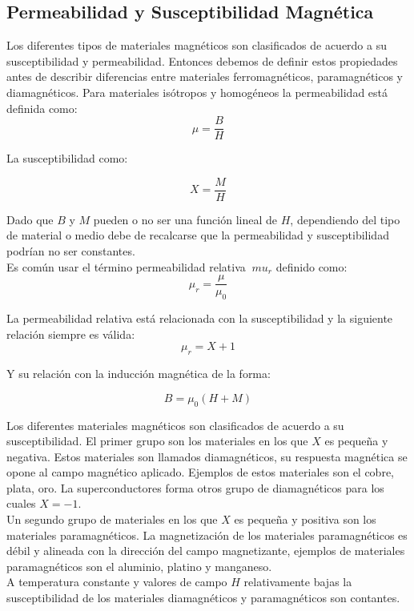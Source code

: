 \subsection{Permeabilidad y Susceptibilidad Magnética}

Los diferentes tipos de materiales magnéticos son clasificados de acuerdo a su susceptibilidad y permeabilidad. Entonces debemos de definir estos propiedades antes de describir diferencias entre materiales ferromagnéticos, paramagnéticos y diamagnéticos.
Para materiales isótropos y homogéneos la permeabilidad está definida como:
\begin{equation}
	\mu = \frac{B}{H}
\end{equation}

La susceptibilidad como:

\begin{equation}
	X=\frac{M}{H}
\end{equation}

Dado que $B$ y $M$ pueden o no ser una función lineal de $H$, dependiendo del tipo de material o medio debe de recalcarse que la permeabilidad y susceptibilidad podrían no ser constantes.\\
Es común usar el término permeabilidad relativa $\ mu_r$ definido como:
\begin{equation}
	\mu_r = \frac{\mu }{\mu_0}
\end{equation}

La permeabilidad relativa está relacionada con la susceptibilidad y la siguiente relación siempre es válida:
\begin{equation}
	\mu_r= X+1
\end{equation}

Y su relación con la inducción magnética de la forma:

\begin{equation}
	B=\mu_0 (H + M)
\end{equation}

Los diferentes materiales magnéticos son clasificados de acuerdo a su susceptibilidad. El primer grupo son los materiales  en los que $X$ es pequeña y negativa. Estos materiales son llamados diamagnéticos, su respuesta magnética se opone al campo magnético aplicado. Ejemplos de estos materiales son el cobre, plata, oro.  La superconductores forma otros grupo de diamagnéticos para los cuales $X=-1$.\\
Un segundo grupo de materiales en los que $X$ es pequeña y positiva son los materiales paramagnéticos. La magnetización de los materiales paramagnéticos es débil y alineada con la dirección del campo magnetizante, ejemplos de materiales paramagnéticos son el aluminio, platino y manganeso.\\
A temperatura constante y valores de campo $H$ relativamente bajas la susceptibilidad de los materiales diamagnéticos y paramagnéticos son contantes.

